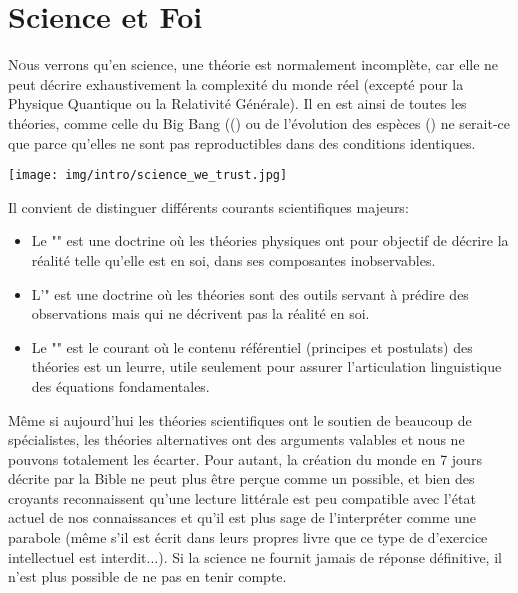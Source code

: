 	\newpage
	\thispagestyle{empty}
	\mbox{}
	\section{Science et Foi}
	\lettrine[lines=4]{\color{BrickRed}N}ous verrons qu'en science, une th\'eorie est normalement incomplète, car elle ne peut d\'ecrire exhaustivement la complexit\'e du monde r\'eel (except\'e pour la Physique Quantique ou la Relativit\'e G\'en\'erale). Il en est ainsi de toutes les th\'eories, comme celle du Big Bang (() ou de l'\'evolution des espèces () ne serait-ce que parce qu'elles ne sont pas reproductibles dans des conditions identiques.
	
	\begin{center}
		\texttt{[image: img/intro/science\_we\_trust.jpg]}
	\end{center}
	
	Il convient de distinguer diff\'erents courants scientifiques majeurs: 
	\begin{itemize}
		\item Le "" est une doctrine où les th\'eories physiques ont pour objectif de d\'ecrire la r\'ealit\'e telle qu'elle est en soi, dans ses composantes inobservables.
	
		\item L'" est une doctrine où les th\'eories sont des outils servant à pr\'edire des observations mais qui ne d\'ecrivent pas la r\'ealit\'e en soi.
	
		\item Le "" est le courant où le contenu r\'ef\'erentiel (principes et postulats) des th\'eories est un leurre, utile seulement pour assurer l'articulation linguistique des \'equations fondamentales.
	\end{itemize}

	Même si aujourd'hui les th\'eories scientifiques ont le soutien de beaucoup de sp\'ecialistes, les th\'eories alternatives ont des arguments valables et nous ne pouvons totalement les \'ecarter. Pour autant, la cr\'eation du monde en 7 jours d\'ecrite par la Bible ne peut plus être perçue comme un possible, et bien des croyants reconnaissent qu'une lecture litt\'erale est peu compatible avec l'\'etat actuel de nos connaissances et qu'il est plus sage de l'interpr\'eter comme une parabole (même s'il est écrit dans leurs propres livre que ce type de d'exercice intellectuel est interdit...). Si la science ne fournit jamais de r\'eponse d\'efinitive, il n'est plus possible de ne pas en tenir compte.
	
